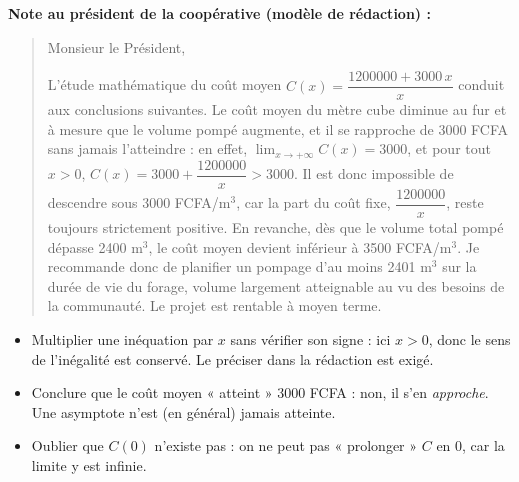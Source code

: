 \documentclass[11pt]{article}
\newcounter{popsec}
\newcounter{popsub}
\newcommand{\courssub}[1]{%
  \stepcounter{popsub}%
  \par\vspace{9pt}\noindent{\popxbold\fontsize{11.5}{13}\selectfont\color{popink}{\color{poporange}\thepopsec.\thepopsub}\hspace{6pt}#1}\par\nopagebreak\vspace{4pt}
}
\begin{document}
\begin{exoresolu}
\textbf{Note au président de la coopérative (modèle de rédaction) :}

\begin{quote}
Monsieur le Président,

L'étude mathématique du coût moyen $C(x) = \dfrac{\num{1200000} + \num{3000}\,x}{x}$ conduit aux conclusions suivantes. Le coût moyen du mètre cube diminue au fur et à mesure que le volume pompé augmente, et il se rapproche de \num{3000} FCFA sans jamais l'atteindre : en effet, $\displaystyle\lim_{x \to +\infty} C(x) = \num{3000}$, et pour tout $x > 0$, $C(x) = \num{3000} + \dfrac{\num{1200000}}{x} > \num{3000}$. Il est donc impossible de descendre sous \num{3000} FCFA/m$^3$, car la part du coût fixe, $\dfrac{\num{1200000}}{x}$, reste toujours strictement positive. En revanche, dès que le volume total pompé dépasse \num{2400} m$^3$, le coût moyen devient inférieur à \num{3500} FCFA/m$^3$. Je recommande donc de planifier un pompage d'au moins \num{2401} m$^3$ sur la durée de vie du forage, volume largement atteignable au vu des besoins de la communauté. Le projet est rentable à moyen terme.
\end{quote}
\end{exoresolu}

\begin{attention}
\begin{itemize}
\item Multiplier une inéquation par $x$ sans vérifier son signe : ici $x > 0$, donc le sens de l'inégalité est conservé. Le préciser dans la rédaction est exigé.
\item Conclure que le coût moyen « atteint » \num{3000} FCFA : non, il s'en \emph{approche}. Une asymptote n'est (en général) jamais atteinte.
\item Oublier que $C(0)$ n'existe pas : on ne peut pas « prolonger » $C$ en $0$, car la limite y est infinie.
\end{itemize}
\end{attention}

\courssub{Bilan de l'activité}
\end{document}

